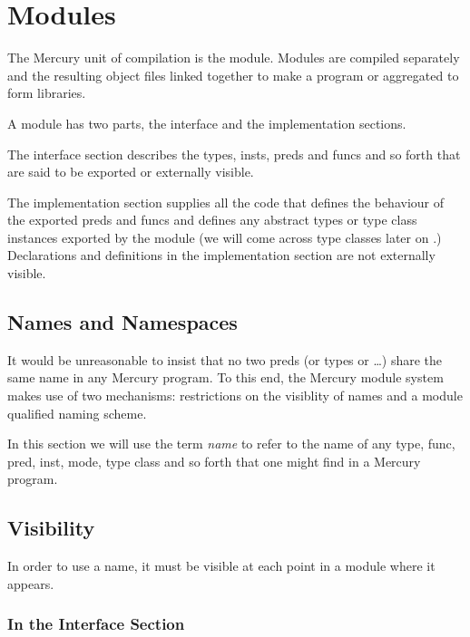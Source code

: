 
\chapter{Modules}

The Mercury unit of compilation is the module.  Modules
are compiled separately and the resulting object files linked
together to make a program or aggregated to form libraries.

A module has two parts, the interface and the implementation sections.

The interface section describes the types, insts, preds and funcs and so
forth that are said to be exported or externally visible.

The implementation section supplies all the code that defines the
behaviour of the exported preds and funcs and defines any abstract
types or type class instances exported by the module (we will come
across type classes later on \XXX{}.)  Declarations and definitions in
the implementation section are not externally visible.

\section{Names and Namespaces}

It would be unreasonable to insist that no two preds (or types
or \ldots) share the same name in any Mercury program.  To this
end, the Mercury module system makes use of two mechanisms:
restrictions on the visiblity of names and a module qualified
naming scheme.

In this section we will use the term \emph{name} to refer to the
name of any type, func, pred, inst, mode, type class and so
forth that one might find in a Mercury program.

\section{Visibility}

In order to use a name, it must be visible at each point in
a module where it appears.


\subsection{In the Interface Section}

